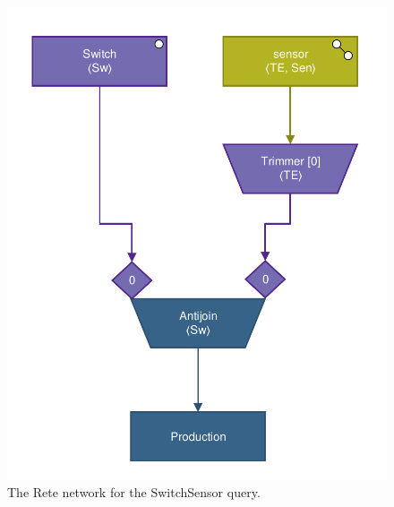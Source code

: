 \begin{figure}[htb]
\begin{minipage}[b]{0.4\textwidth}
\begin{center}
\includegraphics[scale=0.5]{figures/rete-switchsensor-layout.pdf}
\caption{The Rete network for the \textsf{SwitchSensor} query.}
\label{fig:rete-switchsensor-layout}
\end{center}
\end{minipage}
\end{figure}


